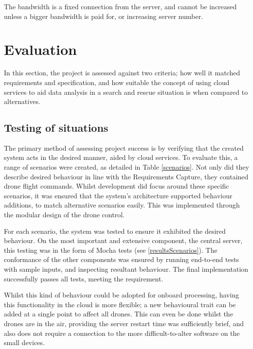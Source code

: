 \documentclass{article}
\begin{document}
The bandwidth is a fixed connection from the server, and cannot be increased unless a bigger bandwidth is paid for, or increasing server number.


\section{Evaluation}
In this section, the project is assessed against two criteria; how well it matched requirements and specification, and how suitable the concept of using cloud services to aid data analysis in a search and rescue situation is when compared to alternatives.
 
\subsection{Testing of situations}
The primary method of assessing project success is by verifying that the created system acts in the desired manner, aided by cloud services. To evaluate this, a range of scenarios were created, as detailed in Table \ref{scenarios}. Not only did they describe desired behaviour in line with the Requirements Capture, they contained drone flight commands. Whilst development did focus around these specific scenarios, it was ensured that the system's architecture supported behaviour additions, to match alternative scenarios easily. This was implemented through the modular design of the drone control.

For each scenario, the system was tested to ensure it exhibited the desired behaviour. On the most important and extensive component, the central server, this testing was in the form of Mocha tests (see \ref{resultsScenarios}). The conformance of the other components was ensured by running end-to-end tests with sample inputs, and inspecting resultant behaviour. The final implementation successfully passes all tests, meeting the requirement. 

Whilst this kind of behaviour could be adopted for onboard processing, having this functionality in the cloud is more flexible; a new behavioural trait can be added at a single point to affect all drones. This can even be done whilst the drones are in the air, providing the server restart time was sufficiently brief, and also does not require a connection to the more difficult-to-alter software on the small devices.
\end{document}
